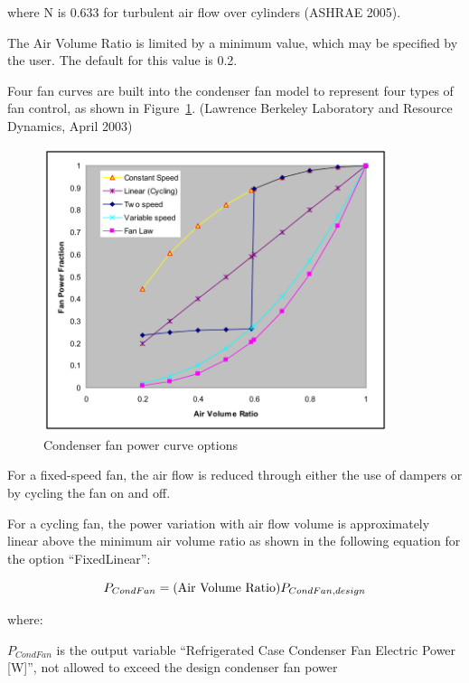where N is 0.633 for turbulent air flow over cylinders (ASHRAE 2005).

The Air Volume Ratio is limited by a minimum value, which may be specified by the user. The default for this value is 0.2.

Four fan curves are built into the condenser fan model to represent four types of fan control, as shown in Figure~\ref{fig:condenser-fan-power-curve-options}. (Lawrence Berkeley Laboratory and Resource Dynamics, April 2003)

\begin{figure}[hbtp] %
\centering
\includegraphics[width=0.9\textwidth, height=0.9\textheight, keepaspectratio=true]{media/image6291.svg.png}
\caption{Condenser fan power curve options \protect \label{fig:condenser-fan-power-curve-options}}
\end{figure}

For a fixed-speed fan, the air flow is reduced through either the use of dampers or by cycling the fan on and off.

For a cycling fan, the power variation with air flow volume is approximately linear above the minimum air volume ratio as shown in the following equation for the option ``FixedLinear'':

\begin{equation}
{P_{CondFan}} = ({\rm{Air~Volume~Ratio}}){P_{CondFan,design}}
\end{equation}

where:

\({P_{CondFan}}\) is the output variable ``Refrigerated Case Condenser Fan Electric Power {[}W{]}'', not allowed to exceed the design condenser fan power

